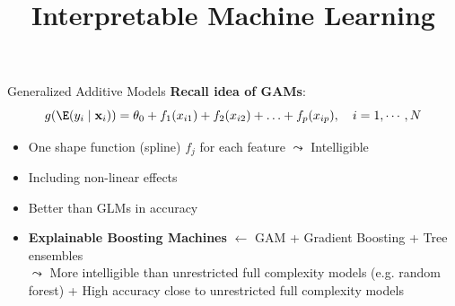 \documentclass[11pt,compress,t,notes=noshow, aspectratio=169, xcolor=table]{beamer}
\title{Interpretable Machine Learning}
\date{}
\begin{document}
\newcommand{\titlefigure}{figure/ebm.jpg}
\newcommand{\learninggoals}{
\item Motivation from GAM
\item Intelligible GAM
\item Accurate GAM + Pairwise Interactions
\item FAST feature interaction detection
}



\begin{frame}{Generalized Additive Models}
\textbf{Recall idea of GAMs}: $$g(\E (y_i \mid \mathbf{x}_i)) = \theta_0 + f_1(x_{i1}) + f_2(x_{i2}) + \ldots + f_p(x_{ip}),\quad i=1,\cdots, N$$
\begin{itemize}
    \item One shape function (spline) $f_j$ for each feature $\leadsto$ Intelligible    
    \item Including non-linear effects
    \item Better than GLMs in accuracy
    \item \textbf{Explainable Boosting Machines} $\leftarrow$ GAM + Gradient Boosting + Tree ensembles \\$\leadsto$ More intelligible than unrestricted full complexity models (e.g. random forest) + High accuracy close to unrestricted full complexity models
\end{itemize}
\end{frame}
\end{document}
